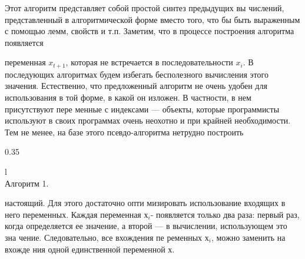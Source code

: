 Этот алгоритм представляет собой простой синтез предыдущих вы­
числений, представленный в алгоритмической форме вместо того, что­
бы быть выраженным с помощью лемм, свойств и т.п. Заметим, что в процессе построения алгоритма появляется
\pagebreak

\noindent переменная $x_{t+1}$, которая
не встречается в последовательности $x_{i}$. В последующих алгоритмах
будем избегать бесполезного вычисления этого значения. Естественно,
что предложенный алгоритм не очень удобен для использования в той
форме, в какой он изложен. В частности, в нем присутствуют пере­
менные с индексами — объекты, которые программисты используют в
своих программах очень неохотно и при крайней необходимости.
Тем не менее, на базе этого псевдо-алгоритма нетрудно построить

\begin{wraptable}{}{0.35\textwidth}
\vspace{-10pt}
\begin{tabular}{l}
\hline
{} \\ \hline
\hspace{20pt} Алгоритм 1.                                                                                                                                                                                                        
\end{tabular}
\vspace{-12pt}
\end{wraptable}
\noindent настоящий. Для этого достаточно опти­
мизировать использование входящих в
него переменных. Каждая переменная \textit{$х_{i}$}-
появляется только два раза: первый раз,
когда определяется ее значение, а второй
— в вычислении, использующем это зна­
чение. Следовательно, все вхождения пе­
ременных \textit{$х_{i}$}, можно заменить на вхожде­
ния одной единственной переменной \textit{$х$}.

